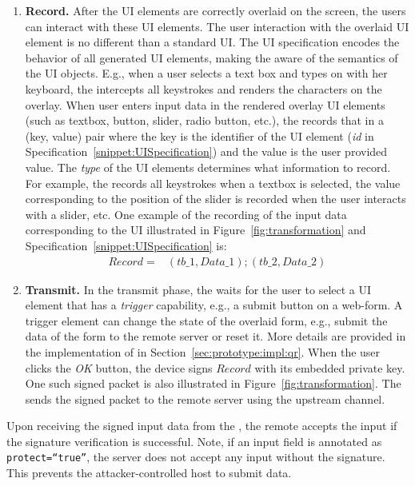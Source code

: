 \begin{enumerate}
\item \textbf{Record.} After the UI elements are correctly overlaid on the screen, the users can interact with these UI elements. The user interaction with the overlaid UI element is no different than a standard UI. The UI specification encodes the behavior of all generated UI elements, making the \device aware of the semantics of the UI objects. E.g., when a user selects a text box and types on with her keyboard, the \device intercepts all keystrokes and renders the characters on the overlay.
When user enters input data in the rendered overlay UI elements (such as textbox, button, slider, radio button, etc.), the \device records that in a (key, value) pair where the key is the identifier of the UI element (\emph{id} in Specification~\ref{snippet:UISpecification}) and the value is the user provided value. The \emph{type} of the UI elements determines what information to record. For example, the \device records all keystrokes when a textbox is selected, the value corresponding to the position of the slider is recorded when the user interacts with a slider, etc. One example of the recording of the input data corresponding to the UI illustrated in Figure~\ref{fig:transformation} and Specification~\ref{snippet:UISpecification} is: 
\begin{align*}
Record = & (tb\_1, Data\_1);(tb\_2,Data\_2)
\end{align*}

\item \textbf{Transmit.} In the transmit phase, the \device waits for the user to select a UI element that has a \emph{trigger} capability, e.g., a submit button on a web-form. A trigger element can change the state of the overlaid form, e.g., submit the data of the form to the remote server or reset it. More details are provided in the implementation of \name in Section~\ref{sec:prototype:impl:qr}. When the user clicks the \emph{OK} button, the device signs $Record$ with its embedded private key. One such signed packet is also illustrated in Figure~\ref{fig:transformation}. The \device sends the signed packet to the remote server using the upstream channel.
\end{enumerate} 

Upon receiving the signed input data from the \device, the remote accepts the input if the signature verification is successful. Note, if an input field is annotated as \texttt{protect=``true''}, the server does not accept any input without the \device signature. This prevents the attacker-controlled host to submit data. 


